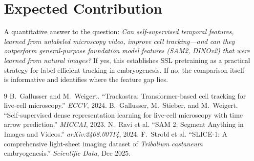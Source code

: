 \documentclass{article}
\begin{document}
\section*{Expected Contribution}

A quantitative answer to the question: \emph{Can self-supervised temporal features, learned from unlabeled microscopy video, improve cell tracking---and can they outperform general-purpose foundation model features (SAM2, DINOv2) that were learned from natural images?} If yes, this establishes SSL pretraining as a practical strategy for label-efficient tracking in embryogenesis. If no, the comparison itself is informative and identifies where the feature gap lies.

\begin{thebibliography}{9}
	 B.~Gallusser and M.~Weigert. ``Trackastra: Transformer-based cell tracking for live-cell microscopy.'' \textit{ECCV}, 2024.
	 B.~Gallusser, M.~Stieber, and M.~Weigert. ``Self-supervised dense representation learning for live-cell microscopy with time arrow prediction.'' \textit{MICCAI}, 2023.
	 N.~Ravi et al. ``SAM 2: Segment Anything in Images and Videos.'' \textit{arXiv:2408.00714}, 2024.
	 F.~Strobl et al. ``SLICE-1: A comprehensive light-sheet imaging dataset of \textit{Tribolium castaneum} embryogenesis.'' \textit{Scientific Data}, Dec 2025.
\end{thebibliography}
\end{document}
